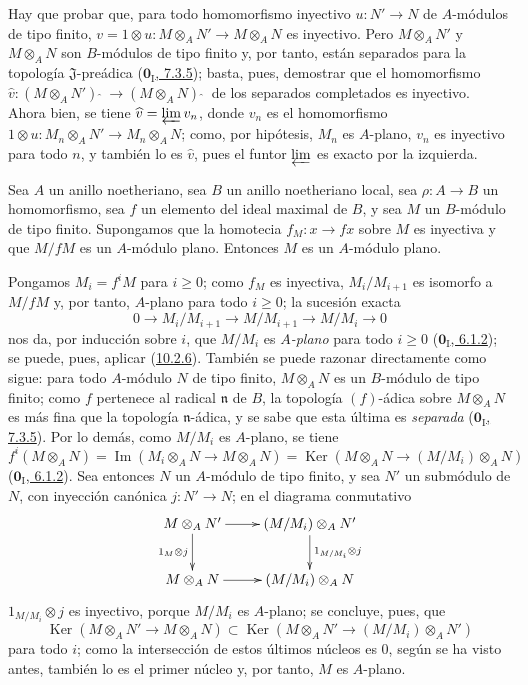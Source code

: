 Hay que probar que, para todo homomorfismo inyectivo $u:N'\to N$ de $A$-módulos de tipo finito, $v=1\otimes u:M\otimes_A N'\to M\otimes_A N$ es inyectivo.
Pero $M\otimes_A N'$ y $M\otimes_A N$ son $B$-módulos de tipo finito y, por tanto, están separados para la topología $\mathfrak{J}$-preádica (\hyperref[0.7.3.5-fr]{$\mathbf{0}_{\mathrm I}$, 7.3.5}); basta, pues, demostrar que el homomorfismo $\widehat v:(M\otimes_A N'){\,\widehat{\,}\,}\to(M\otimes_A N){\,\widehat{\,}\,}$ de los separados completados es inyectivo. Ahora bien, se tiene $\widehat v=\varprojlim v_n$, donde $v_n$ es el homomorfismo $1\otimes u:M_n\otimes_A N'\to M_n\otimes_A N$;
como, por hipótesis, $M_n$ es $A$-plano, $v_n$ es inyectivo para todo $n$, y también lo es $\widehat v$, pues el funtor $\varprojlim$ es exacto por la izquierda.


\begin{corollary}[10.2.7]
\label{0.10.2.7}
\label{0.10.2.7-fr}
Sea $A$ un anillo noetheriano, sea $B$ un anillo noetheriano local, sea $\rho:A\to B$ un homomorfismo, sea $f$ un elemento del ideal maximal de $B$, y sea $M$ un $B$-módulo de tipo finito.
Supongamos que la homotecia $f_M:x\to fx$ sobre $M$ es inyectiva y que $M/fM$ es un $A$-módulo plano.
Entonces $M$ es un $A$-módulo plano.
\end{corollary}

Pongamos $M_i=f^iM$ para $i\geq0$;
como $f_M$ es inyectiva, $M_i/M_{i+1}$ es isomorfo a $M/fM$ y, por tanto, $A$-plano para todo $i\geq0$;
la sucesión exacta
\[
  0\longrightarrow M_i/M_{i+1}\longrightarrow M/M_{i+1}
  \longrightarrow M/M_i\longrightarrow0
\]
nos da, por inducción sobre $i$, que $M/M_i$ es \emph{$A$-plano} para todo $i\geq0$ (\hyperref[0.6.1.2-fr]{$\mathbf{0}_{\mathrm I}$, 6.1.2}); se puede, pues, aplicar (\hyperref[0.10.2.6-fr]{10.2.6}). También se puede razonar directamente como sigue: para todo $A$-módulo $N$ de tipo finito, $M\otimes_A N$ es un $B$-módulo de tipo finito;
como $f$ pertenece al radical $\mathfrak n$ de $B$, la topología $(f)$-ádica sobre $M\otimes_A N$ es más fina que la topología
$\mathfrak n$-ádica, y se sabe que esta última es \emph{separada} (\hyperref[0.7.3.5-fr]{$\mathbf{0}_{\mathrm I}$, 7.3.5}). Por lo demás, como $M/M_i$ es $A$-plano, se tiene
\[
  f^i(M\otimes_A N)=\operatorname{Im}(M_i\otimes_A N\to M\otimes_A N)
  =\operatorname{Ker}(M\otimes_A N\to(M/M_i)\otimes_A N)
\]
(\hyperref[0.6.1.2-fr]{$\mathbf{0}_{\mathrm I}$, 6.1.2}). Sea entonces $N$ un $A$-módulo de tipo finito, y sea $N'$ un submódulo de $N$, con inyección canónica $j:N'\to N$; en el diagrama conmutativo
\[
\xymatrix{
  M\otimes_A N'\ar[r]\ar[d]_{1_M\otimes j} &
  (M/M_i)\otimes_A N'\ar[d]^{1_{M/M_i}\otimes j}\\
  M\otimes_A N\ar[r] & (M/M_i)\otimes_A N
}
\]
$1_{M/M_i}\otimes j$ es inyectivo, porque $M/M_i$ es $A$-plano; se concluye, pues, que
\[
  \operatorname{Ker}(M\otimes_A N'\to M\otimes_A N)
  \subset\operatorname{Ker}(M\otimes_A N'\to(M/M_i)\otimes_A N')
\]
para todo $i$; como la intersección de estos últimos núcleos es $0$, según se ha visto antes, también lo es el primer núcleo y, por tanto, $M$ es $A$-plano.


